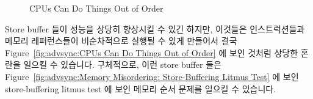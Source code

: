 \begin{figure}[htb]
\centering
{}
\caption{CPUs Can Do Things Out of Order}
\end{figure}

Store buffer 들이 성능을 상당히 향상시킬 수 있긴 하지만, 이것들은
인스트럭션들과 메모리 레퍼런스들이 비순차적으로 실행될 수 있게 만들어서 결국
Figure~\ref{fig:advsync:CPUs Can Do Things Out of Order} 에 보인 것처럼 상당한
혼란을 일으킬 수 있습니다.
구체적으로, 이런 store buffer 들은
Figure~\ref{fig:advsync:Memory Misordering: Store-Buffering Litmus Test}
에 보인 store-buffering litmus test 에 보인 메모리 순서 문제를 일으킬 수
있습니다.

